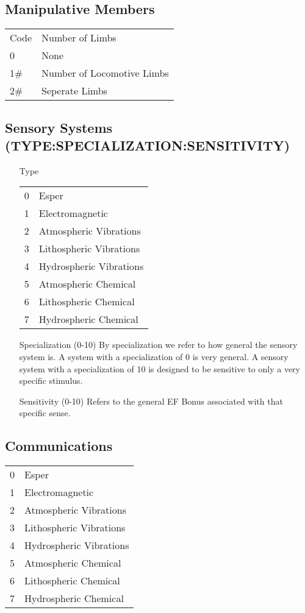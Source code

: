 \subsection{Manipulative Members}

		\begin{tabular}{ll}
		Code 	 &	Number of Limbs \\
		0		 &	None \\
		1\#		 &	Number of Locomotive Limbs \\
		2\#		 &	Seperate Limbs \\
		\end{tabular}

\subsection{Sensory Systems (TYPE:SPECIALIZATION:SENSITIVITY)}

	\begin{itemize}
		\item[Type]
			\begin{tabular}{ll}			    
			0	 &	Esper \\
			1	 &	Electromagnetic \\
			2	 &	Atmospheric Vibrations \\
			3	 &	Lithospheric Vibrations \\
			4	 &	Hydrospheric Vibrations \\
			5	 &	Atmospheric Chemical \\
			6	 &	Lithospheric Chemical \\
			7       & Hydrospheric Chemical \\
			\end{tabular}	

		\item[Specialization (0-10)]
		By specialization we refer to how general the sensory system is. A system 
		with a specialization of 0 is very general. A sensory system with a
		specialization of 10 is designed to be sensitive to only a very 
		specific stimulus.

		\item[Sensitivity (0-10)]
		Refers to the general EF Bonus associated with that specific sense.
	\end{itemize}

\subsection{Communications}

		\begin{tabular}{ll}			    
		0       & Esper \\
		1       & Electromagnetic  \\
		2       & Atmospheric Vibrations \\
		3       & Lithospheric Vibrations \\
		4       & Hydrospheric Vibrations \\
		5       & Atmospheric Chemical \\
		6       & Lithospheric Chemical \\
		7       & Hydrospheric Chemical \\
		\end{tabular}

